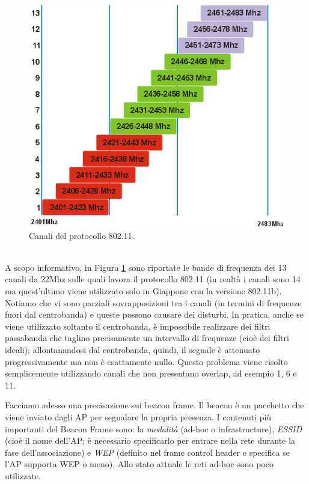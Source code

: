 \begin{figure}[htbp]
	\centering
	\includegraphics[scale = 0.4]{images/802_11-channels}
	\caption{Canali del protocollo 802.11.}
	\label{img:802_11-channels}
\end{figure}\\
A scopo informativo, in Figura \ref{img:802_11-channels} sono riportate le bande di frequenza dei 13 canali da 22Mhz sulle quali lavora il protocollo 802.11 (in realtà i canali sono 14 ma quest'ultimo viene utilizzato solo in Giappone con la versione 802.11b). Notiamo che vi sono parziali sovrapposizioni tra i canali (in termini di frequenze fuori dal centrobanda) e queste possono causare dei disturbi. In pratica, anche se viene utilizzato soltanto il centrobanda, è impossibile realizzare dei filtri passabanda che taglino precisamente un intervallo di frequenze (cioè dei filtri ideali); allontanandosi dal centrobanda, quindi, il segnale è attenuato progressivamente ma non è esattamente nullo. Questo problema viene risolto semplicemente utilizzando canali che non presentano overlap, ad esempio 1, 6 e 11.

Facciamo adesso una precisazione sui beacon frame. Il beacon è un pacchetto che viene inviato dagli AP per segnalare la propria presenza. I contenuti più importanti del Beacon Frame sono: la \textit{modalità} (ad-hoc o infrastructure), \textit{ESSID} (cioè il nome dell'AP; è necessario specificarlo per entrare nella rete durante la fase dell'associazione) e \textit{WEP} (definito nel frame control header e specifica se l'AP supporta WEP o meno). Allo stato attuale le reti ad-hoc sono poco utilizzate.

